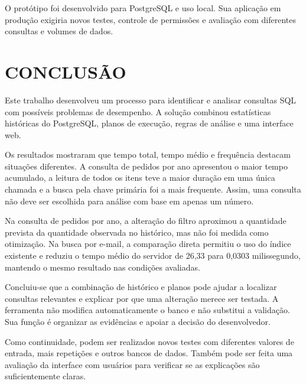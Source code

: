 O protótipo foi desenvolvido para PostgreSQL e uso local. Sua aplicação em produção exigiria novos testes, controle de permissões e avaliação com diferentes consultas e volumes de dados.

\section{CONCLUSÃO}

Este trabalho desenvolveu um processo para identificar e analisar consultas SQL com possíveis problemas de desempenho. A solução combinou estatísticas históricas do PostgreSQL, planos de execução, regras de análise e uma interface web.

Os resultados mostraram que tempo total, tempo médio e frequência destacam situações diferentes. A consulta de pedidos por ano apresentou o maior tempo acumulado, a leitura de todos os itens teve a maior duração em uma única chamada e a busca pela chave primária foi a mais frequente. Assim, uma consulta não deve ser escolhida para análise com base em apenas um número.

Na consulta de pedidos por ano, a alteração do filtro aproximou a quantidade prevista da quantidade observada no histórico, mas não foi medida como otimização. Na busca por e-mail, a comparação direta permitiu o uso do índice existente e reduziu o tempo médio do servidor de 26,33 para 0,0303 milissegundo, mantendo o mesmo resultado nas condições avaliadas.

Concluiu-se que a combinação de histórico e planos pode ajudar a localizar consultas relevantes e explicar por que uma alteração merece ser testada. A ferramenta não modifica automaticamente o banco e não substitui a validação. Sua função é organizar as evidências e apoiar a decisão do desenvolvedor.

Como continuidade, podem ser realizados novos testes com diferentes valores de entrada, mais repetições e outros bancos de dados. Também pode ser feita uma avaliação da interface com usuários para verificar se as explicações são suficientemente claras.
